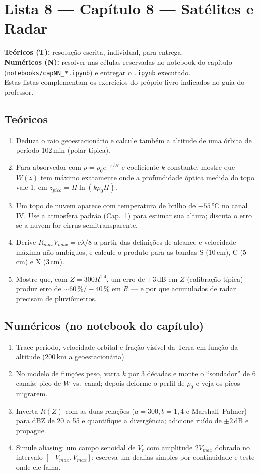\documentclass[11pt]{article}
\newcommand{\instrucoes}{%
\begin{caixalista}
\textbf{Teóricos (T):} resolução escrita, individual, para entrega.\\
\textbf{Numéricos (N):} resolver nas células reservadas no notebook do
capítulo (\texttt{notebooks/capNN\_*.ipynb}) e entregar o
\texttt{.ipynb} executado.\\
Estas listas complementam os exercícios do próprio livro indicados no
guia do professor.
\end{caixalista}}
\begin{document}
\clearpage
\section*{Lista 8 --- Capítulo 8 --- Satélites e Radar}
\instrucoes

\subsection*{Teóricos}

\begin{enumerate}[label=\textbf{T\arabic*.},itemsep=4pt]
  \item Deduza o raio geoestacionário e calcule também a altitude de uma
        órbita de período 102\,min (polar típica).
  \item Para absorvedor com $\rho = \rho_0 e^{-z/H}$ e coeficiente $k$
        constante, mostre que $W(z)$ tem máximo exatamente onde a
        profundidade óptica medida do topo vale 1, em
        $z_{pico} = H\ln(k\rho_0 H)$.
  \item Um topo de nuvem aparece com temperatura de brilho de $-55\,°$C
        no canal IV. Use a atmosfera padrão (Cap.~1) para estimar sua
        altura; discuta o erro se a nuvem for cirrus semitransparente.
  \item Derive $R_{max}V_{max} = c\lambda/8$ a partir das definições de
        alcance e velocidade máxima não ambíguos, e calcule o produto
        para as bandas S (10\,cm), C (5\,cm) e X (3\,cm).
  \item Mostre que, com $Z = 300R^{1.4}$, um erro de $\pm$3\,dB em $Z$
        (calibração típica) produz erro de $\sim$60\,\%$/{-}40$\,\% em
        $R$ — e por que acumulados de radar precisam de pluviômetros.
\end{enumerate}

\subsection*{Numéricos (no notebook do capítulo)}

\begin{enumerate}[label=\textbf{N\arabic*.},itemsep=4pt]
  \item Trace período, velocidade orbital e fração visível da Terra em
        função da altitude (200\,km a geoestacionária).
  \item No modelo de funções peso, varra $k$ por 3 décadas e monte o
        ``sondador'' de 6 canais: pico de $W$ vs.\ canal; depois deforme
        o perfil de $\rho_0$ e veja os picos migrarem.
  \item Inverta $R(Z)$ com as duas relações ($a{=}300,b{=}1{,}4$ e
        Marshall--Palmer) para dBZ de 20 a 55 e quantifique a
        divergência; adicione ruído de $\pm2$\,dB e propague.
  \item Simule aliasing: um campo senoidal de $V_r$ com amplitude
        $2V_{max}$ dobrado no intervalo $[-V_{max}, V_{max}]$; escreva
        um dealias simples por continuidade e teste onde ele falha.
\end{enumerate}
\end{document}
